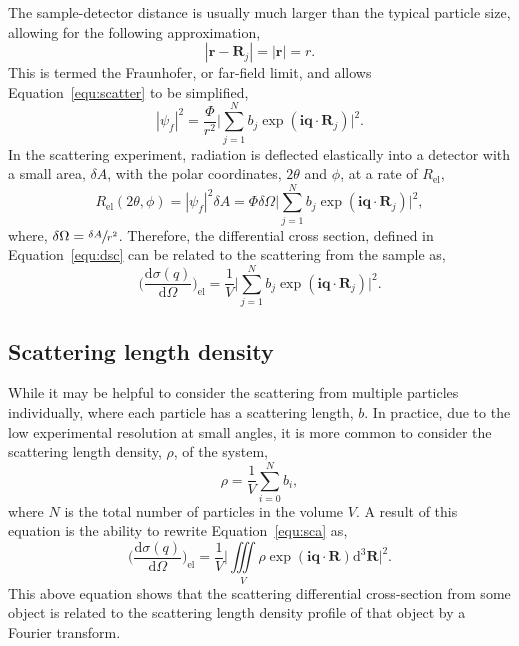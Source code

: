 The sample-detector distance is usually much larger than the typical particle size, allowing for the following approximation,
%
\begin{equation}
    |\mathbf{r} - \mathbf{R}_j| = |\mathbf{r}| = r.
\end{equation}
%
This is termed the Fraunhofer, or far-field limit, and allows Equation~\ref{equ:scatter} to be simplified,
%
\begin{equation}
    |\psi_f|^2 = \frac{\Phi}{r^2}\Bigg|\sum_{j=1}^{N}b_j\exp{(\mathbf{iq}\cdot\mathbf{R}_j)}\Bigg|^2.
\end{equation}
%
In the scattering experiment, radiation is deflected elastically into a detector with a small area, $\delta A$, with the polar coordinates, $2\theta$ and $\phi$, at a rate of $R_{\text{el}}$,
%
\begin{equation}
    R_{\text{el}}(2\theta,\phi) = |\psi_f|^2\delta A = \Phi\delta\Omega\Bigg|\sum_{j=1}^{N}b_j\exp{(\mathbf{iq}\cdot\mathbf{R}_j)}\Bigg|^2,
\end{equation}
%
where, $\delta\Omega = \sfrac{\delta A}{r^2}$.
Therefore, the differential cross section, defined in Equation~\ref{equ:dsc} can be related to the scattering from the sample as,
%
\begin{equation}
    \bigg(\frac{\text{d}\sigma(q)}{\text{d}\Omega}\bigg)_{\text{el}} = \frac{1}{V} \Bigg|\sum_{j=1}^{N}b_j\exp{(\mathbf{iq}\cdot\mathbf{R}_j)}\Bigg|^2.
    \label{equ:sca}
\end{equation}
%

\subsection{Scattering length density}
\label{sec:sld}

While it may be helpful to consider the scattering from multiple particles individually, where each particle has a scattering length, $b$.
In practice, due to the low experimental resolution at small angles, it is more common to consider the scattering length density, $\rho$, of the system,
%
\begin{equation}
    \rho = \frac{1}{V}\sum_{i=0}^{N} b_i,
\end{equation}
%
where $N$ is the total number of particles in the volume $V$.
A result of this equation is the ability to rewrite Equation~\ref{equ:sca} as,
%
\begin{equation}
    \bigg(\frac{\text{d}\sigma(q)}{\text{d}\Omega}\bigg)_{\text{el}} = \frac{1}{V} \Bigg|\iiint \limits_V \rho\exp{(\mathbf{iq}\cdot\mathbf{R})}\text{d}^3\mathbf{R}\Bigg|^2.
    \label{equ:sldsca}
\end{equation}
%
This above equation shows that the scattering differential cross-section from some object is related to the scattering length density profile of that object by a Fourier transform.

